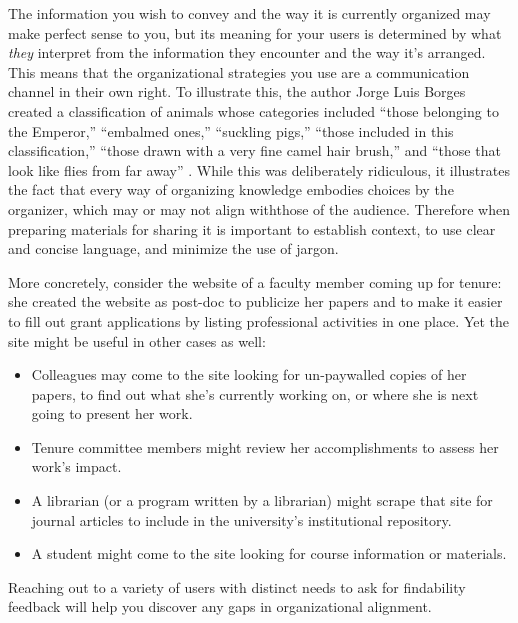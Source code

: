 \documentclass[10pt,letterpaper]{article}
\begin{document}
The information you wish to convey and the way it is currently organized may
make perfect sense to you, but its meaning for your users is determined by what
\emph{they} interpret from the information they encounter and the way it's
arranged. This means that the organizational strategies you use are a
communication channel in their own right. To illustrate this, the author Jorge
Luis Borges created a classification of animals whose categories included
``those belonging to the Emperor,'' ``embalmed ones,'' ``suckling pigs,''
``those included in this classification,'' ``those drawn with a very fine camel
hair brush,'' and ``those that look like flies from far away'' \cite{Borges2000}.
While this was deliberately ridiculous, it illustrates the fact that every way
of organizing knowledge embodies choices by the organizer, which may or may not
align withthose of the audience. Therefore when preparing materials for sharing
it is important to establish context, to use clear and concise language, and
minimize the use of jargon.

More concretely, consider the website of a faculty member coming up for tenure:
she created the website as post-doc to publicize her papers and to make it
easier to fill out grant applications by listing professional activities in one
place. Yet the site might be useful in other cases as well:

\begin{itemize}

\item
  Colleagues may come to the site looking for un-paywalled copies of her papers,
  to find out what she's currently working on, or where she is next going to
  present her work.

\item
  Tenure committee members might review her accomplishments to assess her
  work's impact.

\item
  A librarian (or a program written by a librarian) might scrape that site for
  journal articles to include in the university's institutional repository.

\item
  A student might come to the site looking for course information or materials.

\end{itemize}

Reaching out to a variety of users with distinct needs to ask for findability
feedback will help you discover any gaps in organizational alignment.
\end{document}

